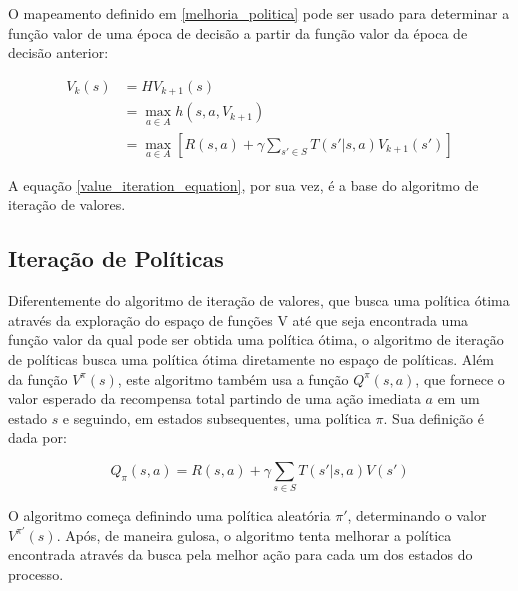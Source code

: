 \documentclass[cic,tc]{iiufrgs}
\begin{document}
O mapeamento definido em \ref{melhoria_politica} pode ser usado para determinar
a função valor de uma época de decisão a partir da função valor da época de
decisão anterior:

\begin{equation} \label{value_iteration_equation}
  \begin{split}
  V_k(s) & = HV_{k+1}(s) \\
  & = \max_{a \in A}h(s, a, V_{k+1}) \\
  & = \max_{a \in A}[R(s, a) + \gamma\sum_{s' \in S}T(s' |s,a)V_{k+1}(s')]
  \end{split}
\end{equation}

A equação \ref{value_iteration_equation}, por sua vez, é a base do algoritmo de
iteração de valores.

\subsection{Iteração de Políticas}

Diferentemente do algoritmo de iteração de valores, que busca uma política
ótima através da exploração do espaço de funções V até que seja encontrada uma
função valor da qual pode ser obtida uma política ótima, o algoritmo de iteração
de políticas busca uma política ótima diretamente no espaço de políticas. Além
da função $V^\pi(s)$, este algoritmo também usa a função $Q^\pi(s,a)$, que
fornece o valor esperado da recompensa total partindo de uma ação imediata $a$
em um estado $s$ e seguindo, em estados subsequentes, uma política $\pi$. Sua
definição é dada por:

\begin{equation}
  Q_\pi(s,a) = R(s,a) + \gamma\sum_{s \in S}T(s'|s, a)V(s')
\end{equation}

O algoritmo começa definindo uma política aleatória $\pi'$, determinando o
valor $V^{\pi'}(s)$. Após, de maneira gulosa, o algoritmo tenta melhorar a
política encontrada através da busca pela melhor ação para cada um dos estados
do processo.
\end{document}
